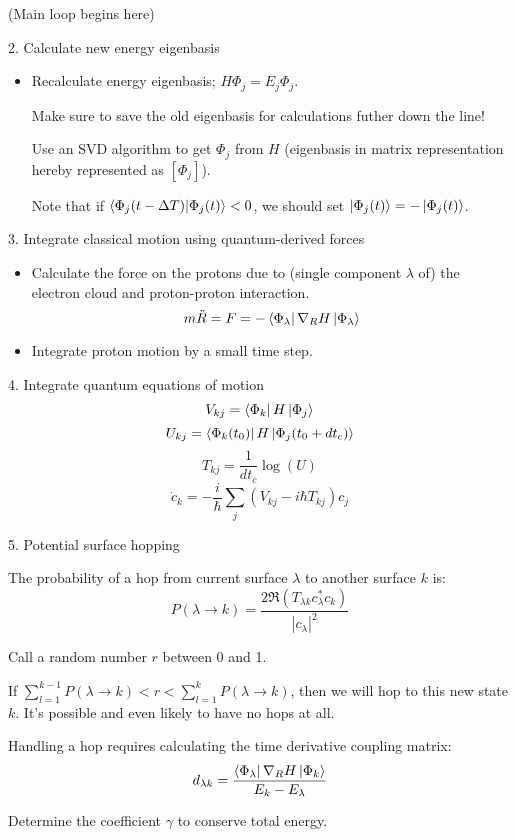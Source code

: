 \documentclass[12pt]{article}
\newcommand{\eigbasis}[0]{[\Phi_j]}
\begin{document}
(Main loop begins here)

2. Calculate new energy eigenbasis
\begin{itemize}
    \item Recalculate energy eigenbasis; $H\Phi_j = E_j\Phi_j$.

        Make sure to save the old eigenbasis for calculations futher down the line!

        Use an SVD algorithm to get $\Phi_j$ from $H$ (eigenbasis in matrix representation hereby represented as $\eigbasis$).

        Note that if $\bra{\Phi_j(t - \Delta T)}\ket{\Phi_j(t)} < 0$, we should set $\ket{\Phi_j(t)} = -\ket{\Phi_j(t)}$.
\end{itemize}

3. Integrate classical motion using quantum-derived forces
\begin{itemize}
    \item Calculate the force on the protons due to (single component $\lambda$ of) the electron cloud and proton-proton interaction.
        \[ m\ddot{R} = F = -\bra{\Phi_\lambda}\nabla_R H\ket{\Phi_\lambda} \]

    \item Integrate proton motion by a small time step.
\end{itemize}

4. Integrate quantum equations of motion
\[ V_{kj} = \bra{\Phi_k}H\ket{\Phi_j} \]
\[ U_{kj} = \bra{\Phi_k(t_0)}H\ket{\Phi_j(t_0 + dt_c)} \]
\[ T_{kj} = \frac{1}{dt_c}\log(U) \]
\[ \dot{c}_k = -\frac{i}{\hbar} \sum_j (V_{kj} - i\hbar T_{kj})c_j \]

5. Potential surface hopping

The probability of a hop from current surface $\lambda$ to another surface $k$ is:
\[ P(\lambda\to k) = \frac{2\Re(T_{\lambda k} c_\lambda^* c_k)}{|c_\lambda|^2} \]

Call a random number $r$ between 0 and 1. 

If $\sum_{l=1}^{k-1} P(\lambda\to k) < r < \sum_{l=1}^k P(\lambda\to k)$, then we will hop to this new state $k$. It's possible and even likely to have no hops at all.

Handling a hop requires calculating the time derivative coupling matrix:
\[ d_{\lambda k} = \frac{\bra{\Phi_\lambda}\nabla_R H\ket{\Phi_k}}{E_k - E_\lambda} \]

Determine the coefficient $\gamma$ to conserve total energy.
\end{document}

